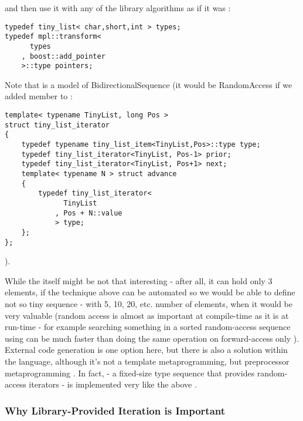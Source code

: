 \documentclass{kapproc}
\begin{document}
and then use it with any of the library algorithms as if it 
was :

{\small
\begin{codesamp}\begin{verbatim}
typedef tiny_list< char,short,int > types;
typedef mpl::transform<
      types
    , boost::add_pointer
    >::type pointers;
\end{verbatim}
\end{codesamp}
}

Note that  is a model of 
BidirectionalSequence (it would be RandomAccess if 
we added  member to :

{\small
\begin{codesamp}\begin{verbatim}
template< typename TinyList, long Pos >
struct tiny_list_iterator
{
    typedef typename tiny_list_item<TinyList,Pos>::type type;
    typedef tiny_list_iterator<TinyList, Pos-1> prior;
    typedef tiny_list_iterator<TinyList, Pos+1> next;
    template< typename N > struct advance
    {
        typedef tiny_list_iterator<
              TinyList
            , Pos + N::value
            > type;
    };
};
\end{verbatim}
\end{codesamp}
}

).

While the  itself might be not that 
interesting - after all, it can hold only 3 elements, if 
the technique above can be automated so we would be able to 
define not so tiny sequence - with 5, 10, 20, etc. number 
of elements, when it would be very valuable (random access 
is almost as important at compile-time as it is at run-time 
- for example searching something in a sorted random-access 
sequence using  can be much faster than 
doing the same operation 
on forward-access only ). External code generation 
is one option here, but there is also a solution within the 
language, although it's not a template metaprogramming, 
but preprocessor metaprogramming \cite{PRE}. In fact, 
 - a fixed-size type sequence that 
provides random-access iterators - is implemented very like 
the above . 

\subsubsection{Why Library-Provided Iteration is Important}
\end{document}
